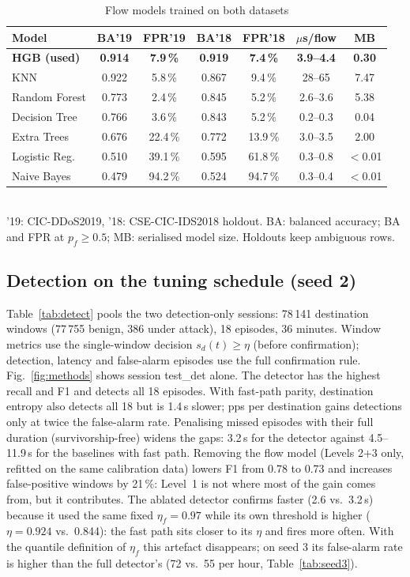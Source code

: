 \documentclass[conference]{IEEEtran}
\begin{document}
\begin{table}[t]
\caption{Flow models trained on both datasets}
\label{tab:flow}
\centering
\setlength{\tabcolsep}{2.6pt}
\begin{tabular}{lcccccc}
\toprule
Model & BA'19 & FPR'19 & BA'18 & FPR'18 & $\mu$s/flow & MB \\
\midrule
\textbf{HGB (used)} & \textbf{0.914} & \textbf{7.9\,\%} & \textbf{0.919} & \textbf{7.4\,\%} & \textbf{3.9--4.4} & \textbf{0.30} \\
KNN & 0.922 & 5.8\,\% & 0.867 & 9.4\,\% & 28--65 & 7.47 \\
Random Forest & 0.773 & 2.4\,\% & 0.845 & 5.2\,\% & 2.6--3.6 & 5.38 \\
Decision Tree & 0.766 & 3.6\,\% & 0.843 & 5.2\,\% & 0.2--0.3 & 0.04 \\
Extra Trees & 0.676 & 22.4\,\% & 0.772 & 13.9\,\% & 3.0--3.5 & 2.00 \\
Logistic Reg. & 0.510 & 39.1\,\% & 0.595 & 61.8\,\% & 0.3--0.8 & $<$0.01 \\
Naive Bayes & 0.479 & 94.2\,\% & 0.524 & 94.7\,\% & 0.3--0.4 & $<$0.01 \\
\bottomrule
\end{tabular}\\[2pt]
\footnotesize '19: CIC-DDoS2019, '18: CSE-CIC-IDS2018 holdout. BA: balanced accuracy; BA and FPR at $p_f\ge0.5$; MB: serialised model size. Holdouts keep ambiguous rows.
\end{table}

\subsection{Detection on the tuning schedule (seed 2)}
Table~\ref{tab:detect} pools the two detection-only sessions: 78\,141 destination windows (77\,755 benign, 386 under attack), 18 episodes, 36 minutes. Window metrics use the single-window decision $s_d(t)\ge\eta$ (before confirmation); detection, latency and false-alarm episodes use the full confirmation rule. Fig.~\ref{fig:methods} shows session test\_det alone. The detector has the highest recall and F1 and detects all 18 episodes. With fast-path parity, destination entropy also detects all 18 but is 1.4\,s slower; pps per destination gains detections only at twice the false-alarm rate. Penalising missed episodes with their full duration (survivorship-free) widens the gaps: 3.2\,s for the detector against 4.5--11.9\,s for the baselines with fast path. Removing the flow model (Levels 2+3 only, refitted on the same calibration data) lowers F1 from 0.78 to 0.73 and increases false-positive windows by 21\,\%: Level~1 is not where most of the gain comes from, but it contributes. The ablated detector confirms faster (2.6 vs.\ 3.2\,s) because it used the same fixed $\eta_f=0.97$ while its own threshold is higher ($\eta=0.924$ vs.\ 0.844): the fast path sits closer to its $\eta$ and fires more often. With the quantile definition of $\eta_f$ this artefact disappears; on seed 3 its false-alarm rate is higher than the full detector's (72 vs.\ 55 per hour, Table~\ref{tab:seed3}).
\end{document}
